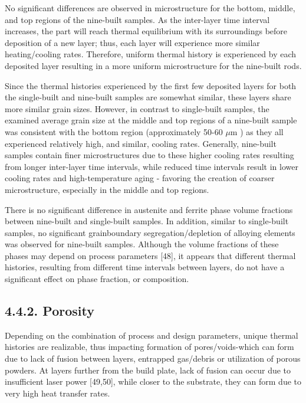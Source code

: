 \documentclass[10pt]{article}
\begin{document}
No significant differences are observed in microstructure for the bottom, middle, and top regions of the nine-built samples. As the inter-layer time interval increases, the part will reach thermal equilibrium with its surroundings before deposition of a new layer; thus, each layer will experience more similar heating/cooling rates. Therefore, uniform thermal history is experienced by each deposited layer resulting in a more uniform microstructure for the nine-built rods.

Since the thermal histories experienced by the first few deposited layers for both the single-built and nine-built samples are somewhat similar, these layers share more similar grain sizes. However, in contrast to single-built samples, the examined average grain size at the middle and top regions of a nine-built sample was consistent with the bottom region (approximately 50-60 $\mu \mathrm{m}$ ) as they all experienced relatively high, and similar, cooling rates. Generally, nine-built samples contain finer microstructures due to these higher cooling rates resulting from longer inter-layer time intervals, while reduced time intervals result in lower cooling rates and high-temperature aging - favoring the creation of coarser microstructure, especially in the middle and top regions.

There is no significant difference in austenite and ferrite phase volume fractions between nine-built and single-built samples. In addition, similar to single-built samples, no significant grainboundary segregation/depletion of alloying elements was observed for nine-built samples. Although the volume fractions of these phases may depend on process parameters [48], it appears that different thermal histories, resulting from different time intervals between layers, do not have a significant effect on phase fraction, or composition.

\subsection*{4.4.2. Porosity}
Depending on the combination of process and design parameters, unique thermal histories are realizable, thus impacting formation of pores/voids-which can form due to lack of fusion between layers, entrapped gas/debris or utilization of porous powders. At layers further from the build plate, lack of fusion can occur due to insufficient laser power [49,50], while closer to the substrate, they can form due to very high heat transfer rates.
\end{document}
